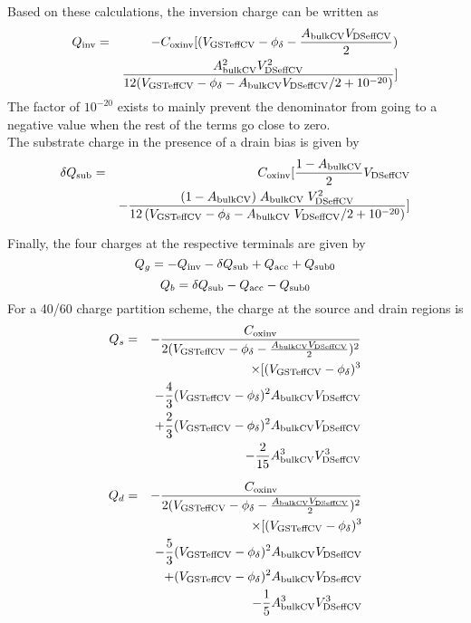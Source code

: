\documentclass{article}
\begin{document}
\noindent Based on these calculations, the inversion charge can be
written as
\begin{eqnarray}
Q_{\rm{inv}}& = & - C_{\rm{oxinv}} [(V_{\rm{GSTeffCV}} -
\phi_{\delta} - {A_{\rm{bulkCV}} V_{\rm{DSeffCV}}\over
2} ) \nonumber \\
        &  & {A^2_{\rm{bulkCV}} V^2_{\rm{DSeffCV}} \over 12(V_{\rm{GSTeffCV}} - \phi_{\delta} - A_{\rm{bulkCV}} V_{\rm{DSeffCV}}/2 + 10^{-20})}]
\end{eqnarray}
The factor of $10^{-20}$ exists to mainly prevent the denominator
from going to a
negative value when the rest of the terms go close to zero.\\
The substrate charge in the presence of a drain bias is given by
\begin{eqnarray}
\delta Q_{\rm{sub}} & = & C_{\rm{oxinv}}[{1 - A_{\rm{bulkCV}} \over 2}V_{\rm{DSeffCV}} \\
       & & - {(1 - A_{\rm{bulkCV}})\;A_{\rm{bulkCV}} \;V^2_{\rm{DSeffCV}} \over 12\,(V_{\rm{GSTeffCV}} - \phi_{\delta} - A_{\rm{bulkCV}}\; V_{\rm{DSeffCV}}/2 + 10^{-20})}]
\end{eqnarray}

\noindent Finally, the four charges at the respective terminals
are given by
\begin{equation}
Q_g = -Q_{\rm{inv}} - \delta Q_{\rm{sub}} + Q_{\rm{acc}} +
Q_{\rm{sub0}}
\end{equation}
\begin{equation}
Q_b = \delta Q_{\rm{sub}} - Q_{\rm{acc}} - Q_{\rm{sub0}}
\end{equation}
For a 40/60 charge partition scheme, the charge at the source and
drain regions is
\begin{eqnarray}
Q_s & = & - {C_{\rm{oxinv}} \over 2(V_{\rm{GSTeffCV}} -
\phi_{\delta} - {A_{\rm{bulkCV}} V_{\rm{DSeffCV}}
\over 2})^2} \nonumber \\
  & & \times [ (V_{\rm{GSTeffCV}} - \phi_{\delta})^3 \nonumber \\
  & & - {4 \over 3}(V_{\rm{GSTeffCV}} - \phi_{\delta})^2 A_{\rm{bulkCV}} V_{\rm{DSeffCV}} \nonumber \\
  & & + {2 \over 3}(V_{\rm{GSTeffCV}} - \phi_{\delta})^2 A_{\rm{bulkCV}} V_{\rm{DSeffCV}} \nonumber \\
  & & - {2 \over 15} A^3_{\rm{bulkCV}} V^3_{\rm{DSeffCV}}
\end{eqnarray}

\begin{eqnarray}
Q_d & = & - {C_{\rm{oxinv}} \over 2(V_{\rm{GSTeffCV}} -
\phi_{\delta} - {A_{\rm{bulkCV}} V_{\rm{DSeffCV}}
\over 2})^2} \nonumber \\
 & & \times [ (V_{\rm{GSTeffCV}} - \phi_{\delta})^3 \nonumber \\
 & & - {5 \over 3}(V_{\rm{GSTeffCV}} - \phi_{\delta})^2 A_{\rm{bulkCV}} V_{\rm{DSeffCV}} \nonumber \\
 & & + (V_{\rm{GSTeffCV}} - \phi_{\delta})^2 A_{\rm{bulkCV}} V_{\rm{DSeffCV}} \nonumber \\
 & & - {1 \over 5} A^3_{\rm{bulkCV}} V^3_{\rm{DSeffCV}}
\end{eqnarray}
\end{document}
